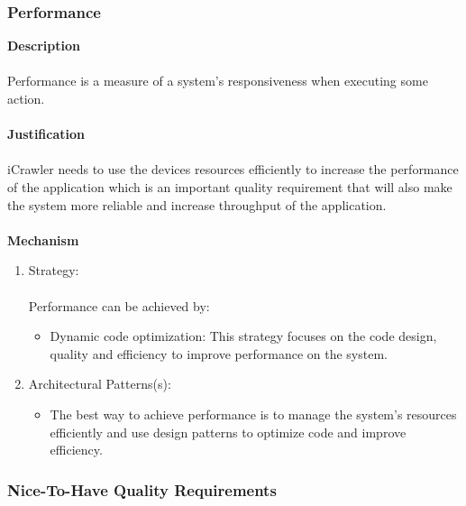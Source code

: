 \documentclass[hidelinks, 12pt, oneside]{article}
\begin{document}
			\subsubsection*{Performance}
			\textbf{Description}\\\\
			Performance is a measure of a system's responsiveness when executing some action.\\\\
			\textbf{Justification}\\\\
			iCrawler needs to use the devices resources efficiently to increase the performance of the application which is an important quality requirement that will also make the system more reliable and increase throughput of the application.\\\\
			\textbf{Mechanism}
			\begin{enumerate}
				\item Strategy:\\\\
				Performance can be achieved by:
				\begin{itemize}
				\item Dynamic code optimization: This strategy focuses on the code design, quality and efficiency to improve performance on the system.  
				\end{itemize}
				\item Architectural Patterns(s):
				\begin{itemize}
				\item The best way to achieve performance is to manage the system's resources efficiently and use design patterns to optimize code and improve efficiency.   
				\end{itemize}
			\end{enumerate}	
			
		\newpage
		\subsubsection{Nice-To-Have Quality Requirements}
\end{document}
